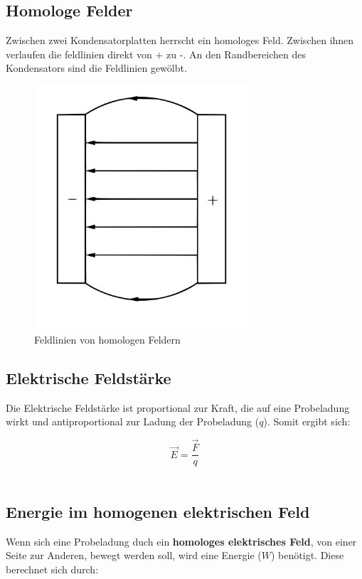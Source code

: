 \documentclass[a4paper]{article}
\begin{document}
\newpage
\subsection{Homologe Felder}
Zwischen zwei Kondensatorplatten herrscht ein homologes Feld. Zwischen ihnen verlaufen die feldlinien
direkt von + zu -. An den Randbereichen des Kondensators sind die Feldlinien gewölbt.

\begin{figure} [h]
	\begin{center}
		\includegraphics[width=8cm]{Bilder/homFeld.png}
		\caption{Feldlinien von homologen Feldern}
	\end{center}
\end{figure}



\subsection{Elektrische Feldstärke}
Die Elektrische Feldstärke ist proportional zur Kraft, die auf eine Probeladung wirkt und antiproportional
zur Ladung der Probeladung ($q$). Somit ergibt sich:

\Large$$\vec{E} = \dfrac{\vec{F}}{q}$$\normalsize\\



\newpage
\subsection{Energie im homogenen elektrischen Feld}
Wenn sich eine Probeladung duch ein \textbf{homologes elektrisches Feld}, von einer Seite zur Anderen,
bewegt werden soll, wird eine Energie ($W$) benötigt. Diese berechnet sich durch:
\end{document}
